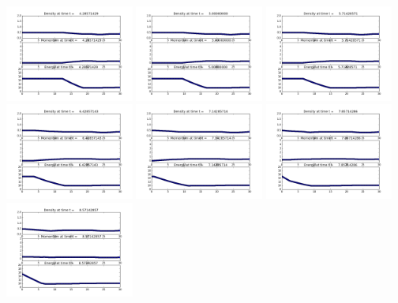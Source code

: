 \documentclass[11pt]{article}
\begin{document}
\vskip 10pt 
\includegraphics[width=0.316666666667\textwidth]{frame0006fig1.png}
\vskip 10pt 
\includegraphics[width=0.316666666667\textwidth]{frame0007fig1.png}
\vskip 10pt 
\includegraphics[width=0.316666666667\textwidth]{frame0008fig1.png}
\vskip 10pt 
\includegraphics[width=0.316666666667\textwidth]{frame0009fig1.png}
\vskip 10pt 
\includegraphics[width=0.316666666667\textwidth]{frame0010fig1.png}
\vskip 10pt 
\includegraphics[width=0.316666666667\textwidth]{frame0011fig1.png}
\vskip 10pt 
\includegraphics[width=0.316666666667\textwidth]{frame0012fig1.png}
\end{document}
